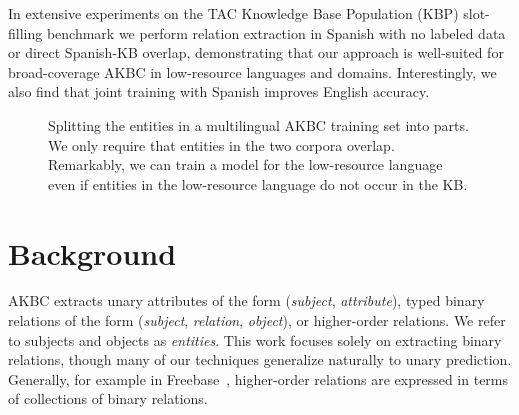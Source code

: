 In extensive experiments on the TAC Knowledge Base Population (KBP) slot-filling benchmark we perform relation extraction in Spanish with no labeled data or direct Spanish-KB overlap, demonstrating that our approach is well-suited for broad-coverage AKBC in low-resource languages and domains. Interestingly, we also find that joint training with Spanish improves English accuracy. 

\begin{figure}[h!]
\begin{center}
\vspace{-1.9069cm}

\def\firstcircle{(0,0) circle (1.5cm)}
\def\secondcircle{(0:2cm) circle (1.5cm)}
\def\midline{[line width=1pt, dashed] node[label={[label distance=-3cm]-15:in KB}] {} node[label={[label distance=-3.5cm]15:not in KB}] {} (-3,0) -- (5,0)}
\caption{Splitting the entities in a multilingual AKBC training set into parts. We only require that entities in the two corpora overlap. Remarkably, we can train a model for the low-resource language even if entities in the low-resource language do not occur in the KB. \label{tab:multilingual-corpora}}
\end{center}
\vspace{-.4cm}
\end{figure}

\section{Background \label{sec:background}}

AKBC extracts unary attributes of the form (\textit{subject}, \textit{attribute}), typed binary relations of the form (\textit{subject}, \textit{relation}, \textit{object}), or higher-order relations. We refer to subjects and objects as \textit{entities}. This work focuses solely on extracting binary relations, though many of our techniques generalize naturally to unary prediction. Generally, for example in Freebase~\citep{freebase}, higher-order relations are expressed in terms of collections of binary relations.

